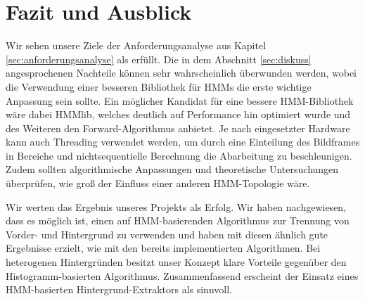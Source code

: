 \section{Fazit und Ausblick}
\label{chap:fazit}

Wir sehen unsere Ziele der Anforderungsanalyse aus Kapitel \ref{sec:anforderungsanalyse} als erfüllt. Die in dem Abschnitt \ref{sec:diskuss} angesprochenen Nachteile können sehr wahrscheinlich überwunden werden, wobei die Verwendung einer besseren Bibliothek für HMMs die erste wichtige Anpassung sein sollte. Ein möglicher Kandidat für eine bessere HMM-Bibliothek wäre dabei HMMlib, welches deutlich auf Performance hin optimiert wurde und des Weiteren den Forward-Algorithmus anbietet. Je nach eingesetzter Hardware kann auch Threading verwendet werden, um durch eine Einteilung des Bildframes in Bereiche und nichtsequentielle Berechnung die Abarbeitung zu beschleunigen. Zudem sollten algorithmische Anpassungen und theoretische Untersuchungen überprüfen, wie groß der Einfluss einer anderen HMM-Topologie wäre.


Wir werten das Ergebnis unseres Projekts als Erfolg. Wir haben nachgewiesen, dass es möglich ist, einen auf HMM-basierenden Algorithmus zur Trennung von Vorder- und Hintergrund zu verwenden und haben mit diesen ähnlich gute Ergebnisse erzielt, wie mit den bereits implementierten Algorithmen. Bei heterogenen Hintergründen besitzt unser Konzept klare Vorteile gegenüber den Histogramm-basierten Algorithmus. Zusammenfassend erscheint der Einsatz eines HMM-basierten Hintergrund-Extraktors als sinnvoll.





